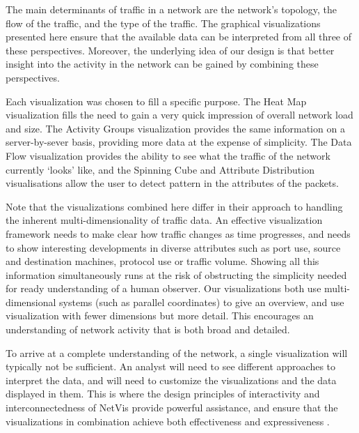 The main determinants of traffic in a network are the network's topology, the flow of the traffic, and the type of the traffic. The graphical visualizations presented here ensure that the available data can be interpreted from all three of these perspectives. Moreover, the underlying idea of our design is that better insight into the activity in the network can be gained by combining these perspectives.

Each visualization was chosen to fill a specific purpose.  The Heat Map visualization fills the need to gain a very quick impression of overall network load and size.  The Activity Groups visualization provides the same information on a server-by-sever basis, providing more data at the expense of simplicity.  The Data Flow visualization provides the ability to see what the traffic of the network currently `looks' like, and the Spinning Cube and Attribute Distribution visualisations allow the user to detect pattern in the attributes of the packets.

Note that the visualizations combined here differ in their approach to handling the inherent multi-dimensionality of traffic data. An effective visualization framework needs to make clear how traffic changes as time progresses, and needs to show interesting developments in diverse attributes such as port use, source and destination machines, protocol use or traffic volume. Showing all this information simultaneously runs at the risk of obstructing the simplicity needed for ready understanding of a human observer. Our visualizations both use multi-dimensional systems (such as parallel coordinates) to give an overview, and use visualization with fewer dimensions but more detail. This encourages an understanding of network activity that is both broad and detailed.

To arrive at a complete understanding of the network, a single visualization will typically not be sufficient. An analyst will need to see different approaches to interpret the data, and will need to customize the visualizations and the data displayed in them. This is where the design principles of interactivity and interconnectedness of NetVis provide powerful assistance, and ensure that the visualizations in combination achieve both effectiveness and expressiveness \cite{mackinlay1987automatic}. 